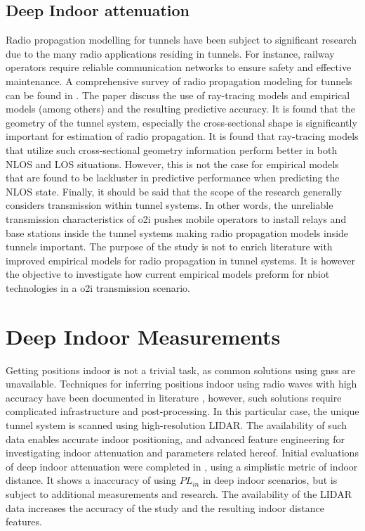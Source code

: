 \subsection{Deep Indoor attenuation}
Radio propagation modelling for tunnels have been subject to significant research due to the many radio applications residing in tunnels. For instance, railway operators require reliable communication networks to ensure safety and effective maintenance. A comprehensive survey of radio propagation modeling for tunnels can be found in \cite{Hrovat2014ATunnels}. The paper discuss the use of ray-tracing models and empirical models (among others) and the resulting predictive accuracy. It is found that the geometry of the tunnel system, especially the cross-sectional shape is significantly important for estimation of radio propagation. It is found that ray-tracing models that utilize such cross-sectional geometry information perform better in both NLOS and LOS situations. However, this is not the case for empirical models that are found to be lackluster in predictive performance when predicting the NLOS state. Finally, it should be said that the scope of the research generally considers transmission within tunnel systems. In other words, the unreliable transmission characteristics of \gls{o2i} pushes mobile operators to install relays and base stations inside the tunnel systems making radio propagation models inside tunnels important. The purpose of the study is not to enrich literature with improved empirical models for radio propagation in tunnel systems. It is however the objective to investigate how current empirical models preform for \gls{nbiot} technologies in a \gls{o2i} transmission scenario.

\section{Deep Indoor Measurements}
Getting positions indoor is not a trivial task, as common solutions using \gls{gnss} are unavailable. Techniques for inferring positions indoor using radio waves with high accuracy have been documented in literature \cite{Nuaimi2011}, however, such solutions require complicated infrastructure and post-processing. In this particular case, the unique tunnel system is scanned using high-resolution LIDAR. The availability of such data enables accurate indoor positioning, and advanced feature engineering for investigating indoor attenuation and parameters related hereof.  Initial evaluations of deep indoor attenuation were completed in \cite{Malarski2019InvestigationAttenuation}, using a simplistic metric of indoor distance. It shows a inaccuracy of using $PL_{in}$ in deep indoor scenarios, but is subject to additional measurements and research. The availability of the LIDAR data increases the accuracy of the study and the resulting indoor distance features. 


